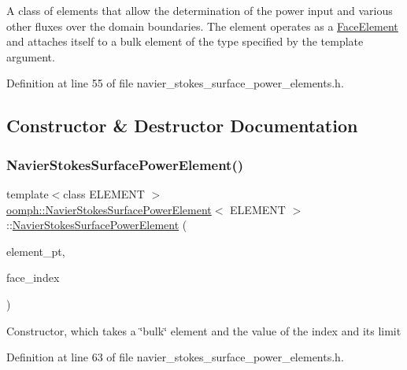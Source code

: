 A class of elements that allow the determination of the power input and various other fluxes over the domain boundaries. The element operates as a \hyperlink{classoomph_1_1FaceElement}{Face\+Element} and attaches itself to a bulk element of the type specified by the template argument. 

Definition at line 55 of file navier\+\_\+stokes\+\_\+surface\+\_\+power\+\_\+elements.\+h.



\subsection{Constructor \& Destructor Documentation}
\mbox{\label{classoomph_1_1NavierStokesSurfacePowerElement_a4755269a509f63be1917ad5dd4061939}} 
\subsubsection{\texorpdfstring{Navier\+Stokes\+Surface\+Power\+Element()}{NavierStokesSurfacePowerElement()}}
{\footnotesize\ttfamily template$<$class E\+L\+E\+M\+E\+NT $>$ \\
\hyperlink{classoomph_1_1NavierStokesSurfacePowerElement}{oomph\+::\+Navier\+Stokes\+Surface\+Power\+Element}$<$ E\+L\+E\+M\+E\+NT $>$\+::\hyperlink{classoomph_1_1NavierStokesSurfacePowerElement}{Navier\+Stokes\+Surface\+Power\+Element} (\begin{DoxyParamCaption}\item[{\hyperlink{classoomph_1_1FiniteElement}{Finite\+Element} $\ast$const \&}]{element\+\_\+pt,  }\item[{const int \&}]{face\+\_\+index }\end{DoxyParamCaption})\hspace{0.3cm}{\ttfamily [inline]}}

Constructor, which takes a \char`\"{}bulk\char`\"{} element and the value of the index and its limit 

Definition at line 63 of file navier\+\_\+stokes\+\_\+surface\+\_\+power\+\_\+elements.\+h.



